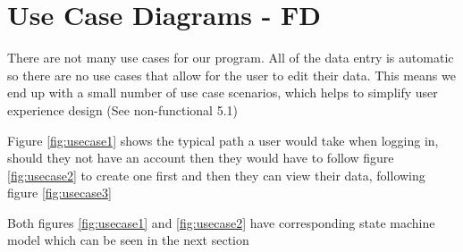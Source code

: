 \documentclass[10pt, notitlepage]{report}
\begin{document}
\section{Use Case Diagrams - FD}

There are not many use cases for our program. All of the data entry is automatic so there are no use cases that allow for the user to edit their data. This means we end up with a small number of use case scenarios, which helps to simplify user experience design (See non-functional 5.1)

Figure \ref{fig:usecase1} shows the typical path a user would take when logging in, should they not have an account then they would have to follow figure \ref{fig:usecase2} to create one first and then they can view their data, following figure \ref{fig:usecase3}

Both figures \ref{fig:usecase1} and \ref{fig:usecase2} have corresponding state machine model which can be seen in the next section
\end{document}
